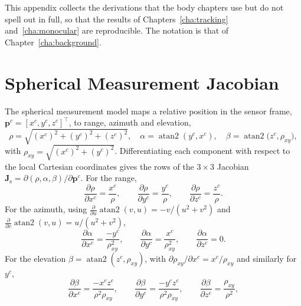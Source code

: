 
This appendix collects the derivations that the body chapters use but do not
spell out in full, so that the results of Chapters~\ref{cha:tracking}
and~\ref{cha:monocular} are reproducible. The notation is that of
Chapter~\ref{cha:background}.

\section{Spherical Measurement Jacobian}
\label{ap:spherical_jac}

The spherical measurement model maps a relative position in the sensor frame,
$\bm{p}^{c}=[x^{c},y^{c},z^{c}]^{\top}$, to range, azimuth and elevation,
\begin{equation}
  \rho = \sqrt{(x^{c})^{2}+(y^{c})^{2}+(z^{c})^{2}}, \quad
  \alpha = \operatorname{atan2}(y^{c},x^{c}), \quad
  \beta = \operatorname{atan2}\!\big(z^{c},\rho_{xy}\big),
\end{equation}
with $\rho_{xy}=\sqrt{(x^{c})^{2}+(y^{c})^{2}}$. Differentiating each component
with respect to the local Cartesian coordinates gives the rows of the
$3\times3$ Jacobian $\bm{J}_{\mathrm{s}}=\partial(\rho,\alpha,\beta)/\partial\bm{p}^{c}$.
For the range,
\begin{equation}
  \frac{\partial\rho}{\partial x^{c}}=\frac{x^{c}}{\rho},\qquad
  \frac{\partial\rho}{\partial y^{c}}=\frac{y^{c}}{\rho},\qquad
  \frac{\partial\rho}{\partial z^{c}}=\frac{z^{c}}{\rho}.
\end{equation}
For the azimuth, using $\tfrac{\partial}{\partial u}\operatorname{atan2}(v,u)=-v/(u^2+v^2)$ and
$\tfrac{\partial}{\partial v}\operatorname{atan2}(v,u)=u/(u^2+v^2)$,
\begin{equation}
  \frac{\partial\alpha}{\partial x^{c}}=\frac{-y^{c}}{\rho_{xy}^{2}},\qquad
  \frac{\partial\alpha}{\partial y^{c}}=\frac{x^{c}}{\rho_{xy}^{2}},\qquad
  \frac{\partial\alpha}{\partial z^{c}}=0.
\end{equation}
For the elevation $\beta=\operatorname{atan2}(z^{c},\rho_{xy})$, with
$\partial\rho_{xy}/\partial x^{c}=x^{c}/\rho_{xy}$ and similarly for $y^{c}$,
\begin{equation}
  \frac{\partial\beta}{\partial x^{c}}=\frac{-x^{c}z^{c}}{\rho^{2}\rho_{xy}},\qquad
  \frac{\partial\beta}{\partial y^{c}}=\frac{-y^{c}z^{c}}{\rho^{2}\rho_{xy}},\qquad
  \frac{\partial\beta}{\partial z^{c}}=\frac{\rho_{xy}}{\rho^{2}},
\end{equation}
